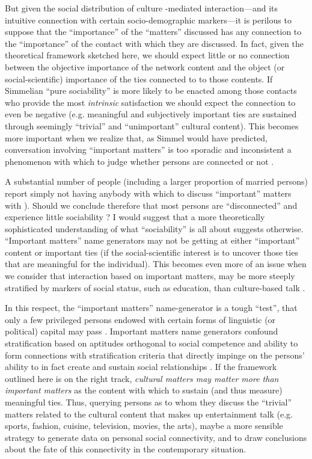 \documentclass[11pt]{article}
\begin{document}
But given the social distribution of culture -mediated interaction---and its intuitive connection with certain socio-demographic markers---it is perilous to suppose that the ``importance'' of the ``matters'' discussed has any connection to the ``importance'' of the contact with which they are discussed.  In fact, given the theoretical framework sketched here, we should expect little or no connection between the objective importance of the network content and the object (or social-scientific) importance of the ties connected to to those contents.  If Simmelian ``pure sociability'' is more likely to be enacted among those contacts who provide the most \emph{intrinsic} satisfaction we should expect the connection to even be negative (e.g. meaningful and subjectively important ties are sustained through seemingly ``trivial'' and ``unimportant'' cultural content).  This becomes more important when we realize that, as Simmel would have predicted, conversation involving ``important matters'' is too sporadic and inconsistent a phenomenon with which to judge whether persons are connected or not \citep{bearman_parigi04}.

A substantial number of people (including a larger proportion of married persons) report simply not having anybody with which to discuss ``important'' matters with \citep{bearman_parigi04}). Should we conclude therefore that most persons are ``disconnected'' and experience little sociability \citep{mcpherson_etal06, putnam00}?  I would suggest that a more theoretically sophisticated understanding of what ``sociability'' is all about suggests otherwise. ``Important matters'' name generators may not be getting at either ``important'' content  or important ties (if the social-scientific interest is to uncover those ties that are meaningful for the individual).  This becomes even more of an issue when we consider that interaction based on important matters, may be more steeply stratified by markers of social status, such as education, than culture-based talk \citep{bourdieu84, mcpherson_etal06, marsden87, fischer82}.

In this respect, the ``important matters'' name-generator is a tough ``test'', that only a few privileged persons endowed with certain forms of linguistic (or political) capital may pass \citep{bourdieu84}. Important matters name generators confound stratification based on aptitudes orthogonal to social competence and ability to form connections with stratification criteria that directly impinge on the persons' ability to in fact create and sustain social relationships \citep{lin99, dimaggio96, lizardo06a}.  If the framework outlined here is on the right track, \emph{cultural matters may matter more than important matters} as the content with which to sustain (and thus measure) meaningful ties.  Thus, querying persons as to whom they discuss the ``trivial'' matters related to the cultural content that makes up entertainment talk (e.g. sports, fashion, cuisine, television, movies, the arts), maybe a more sensible strategy to generate data on personal social connectivity, and to  draw conclusions about the fate of this connectivity in the contemporary situation.
\end{document}
